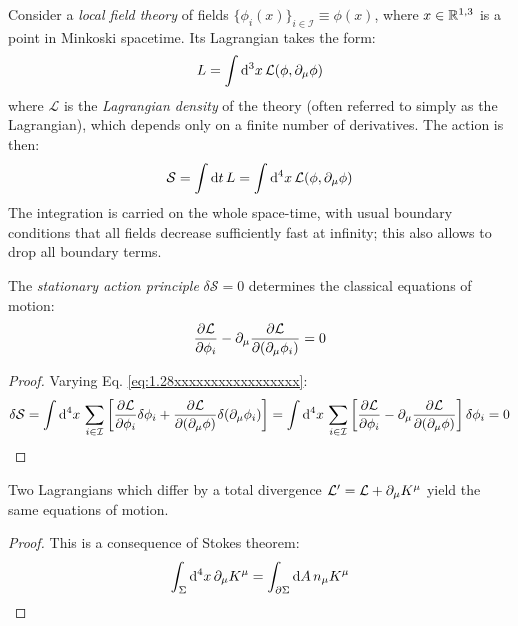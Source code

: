Consider a \textit{local field theory} of fields $ \{\phi_i(x)\}_{i \in \mathcal{I}} \equiv \phi(x) $, where $ x \in \mathbb{R}^{1,3} $ is a point in Minkoski spacetime. Its Lagrangian takes the form:
\begin{equation}
  L = \int \mathrm{d}^3 x\, \mathcal{L}(\phi, \partial_\mu \phi)
  \label{eq:1.27xxxxxxxxxxxxxxx}
\end{equation}
where $ \mathcal{L} $ is the \textit{Lagrangian density} of the theory (often referred to simply as the Lagrangian), which depends only on a finite number of derivatives. The action is then:
\begin{equation}
  \mathcal{S} = \int \mathrm{d} t\, L = \int \mathrm{d}^4 x\, \mathcal{L}(\phi, \partial_\mu \phi)
  \label{eq:1.28xxxxxxxxxxxxxxxxx}
\end{equation}
The integration is carried on the whole space-time, with usual boundary conditions that all fields decrease sufficiently fast at infinity; this also allows to drop all boundary terms.

\begin{proposition}
  The \textit{stationary action principle} $ \delta \mathcal{S} = 0 $ determines the classical equations of motion:
  \begin{equation}
    \frac{\partial \mathcal{L}}{\partial \phi_i} - \partial_\mu \frac{\partial \mathcal{L}}{\partial (\partial_\mu \phi_i)} = 0
    \label{eq:1.29xxxxxxxxxxxxxxxx}
  \end{equation}
\end{proposition}
\begin{proof}
  Varying Eq. \ref{eq:1.28xxxxxxxxxxxxxxxxx}:
  \begin{equation*}
    \delta \mathcal{S} = \int \mathrm{d}^4 x\, \sum_{i \in \mathcal{I}} \left[ \frac{\partial \mathcal{L}}{\partial \phi_i} \delta \phi_i + \frac{\partial \mathcal{L}}{\partial (\partial_\mu \phi)} \delta (\partial_\mu \phi_i) \right] = \int \mathrm{d}^4 x\, \sum_{i \in \mathcal{I}} \left[ \frac{\partial \mathcal{L}}{\partial \phi_i} - \partial_\mu \frac{\partial \mathcal{L}}{\partial (\partial_\mu \phi)} \right] \delta \phi_i = 0
  \end{equation*}
\end{proof}

\begin{proposition}
  Two Lagrangians which differ by a total divergence $ \mathcal{L}' = \mathcal{L} + \partial_\mu K^\mu $ yield the same equations of motion.
\end{proposition}
\begin{proof}
  This is a consequence of Stokes theorem:
  \begin{equation*}
    \int_\Sigma \mathrm{d}^4 x\, \partial_\mu K^\mu = \int_{\partial \Sigma} \mathrm{d} A\, n_\mu K^\mu
  \end{equation*}
\end{proof}


